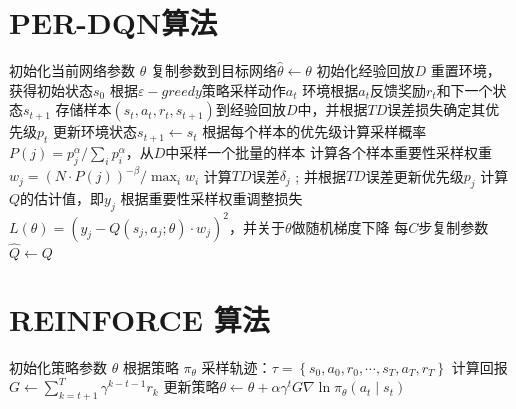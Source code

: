 \documentclass[11pt]{ctexart}
\begin{document}
\section{PER-DQN算法}
\begin{algorithm}[H] %
    \renewcommand{\thealgorithm}{} %
	\caption{} 
    \renewcommand{\algorithmicrequire}{\textbf{输入:}}  
    \renewcommand{\algorithmicensure}{\textbf{输出:}} 
	\begin{algorithmic}[1]
		\STATE 初始化当前网络参数 $\theta$ 
		\STATE 复制参数到目标网络$\hat{\theta} \leftarrow \theta$
		\STATE 初始化经验回放$D$
			\STATE 重置环境，获得初始状态$s_0$
				\STATE 根据$\varepsilon-greedy$策略采样动作$a_t$
				\STATE 环境根据$a_t$反馈奖励$r_t$和下一个状态$s_{t+1}$
				\STATE 存储样本$(s_t,a_t,r_t,s_{t+1})$到经验回放$D$中，并根据$TD$误差损失确定其优先级$p_t$
				\STATE 更新环境状态$s_{t+1} \leftarrow s_t$
				\STATE 根据每个样本的优先级计算采样概率$P(j)=p_j^\alpha / \sum_i p_i^\alpha$，从$D$中采样一个批量的样本
				\STATE 计算各个样本重要性采样权重 $w_j=(N \cdot P(j))^{-\beta} / \max _i w_i$
				\STATE 计算$TD$误差$\delta_j$ ; 并根据$TD$误差更新优先级$p_j$
				\STATE 计算$Q$的估计值，即$y_{j}$
				\STATE 根据重要性采样权重调整损失 $L(\theta)=\left(y_{j}-Q\left(s_{j}, a_{j} ; \theta\right)\cdot w_j \right)^{2}$，并关于$\theta$做随机梯度下降
				\STATE 每$C$步复制参数$\hat{Q}\leftarrow Q$
			\ENDFOR
			
		\ENDFOR
	\end{algorithmic}
\end{algorithm}

\clearpage


\section{REINFORCE 算法}
\begin{algorithm}[H] %
	\renewcommand{\thealgorithm}{} %
	\caption{} 
	\begin{algorithmic}[1] %
		\STATE 初始化策略参数 $\theta$
			\STATE 根据策略 $\pi_{\theta}$ 采样轨迹：$\tau=\left\{s_{0}, a_{0}, r_{0}, \cdots, s_{T}, a_{T}, r_{T}\right\}$
				\STATE 计算回报$G \leftarrow \sum_{k=t+1}^{T} \gamma^{k-t-1} r_{k}$
				\STATE 更新策略$\theta \leftarrow {\theta+\alpha \gamma^{t}} G \nabla \ln \pi_{\theta}\left(a_{t} \mid s_{t}\right)$
			\ENDFOR
		\ENDFOR
	\end{algorithmic}
\end{algorithm}
\clearpage
\end{document}
